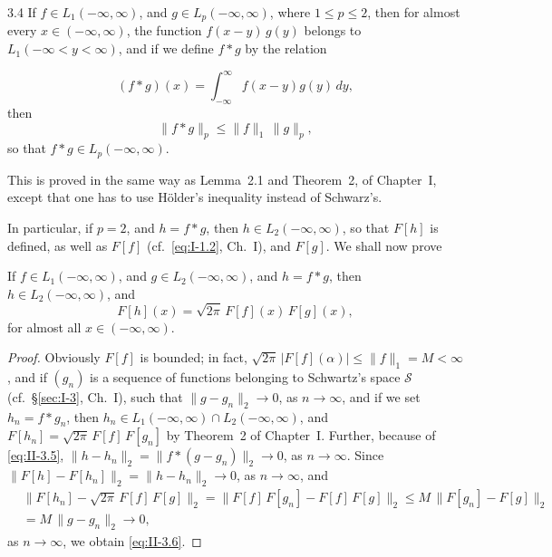 \begin{nstmt}{3.4}\label{eq:II-3.4}
If $f\in L_{1}(-\infty,\infty)$, and $g\in L_{p}(-\infty,\infty)$, where $1\le p\le 2$, then for almost every $x\in(-\infty,\infty)$, the function $f(x-y)\,g(y)$ belongs to $L_{1}(-\infty<y<\infty)$, and if we define $f*g$ by the relation
\end{nstmt}
\[
(f*g)(x)=\int_{-\infty}^{\infty}f(x-y)g(y)\,dy,
\]
then
\begin{equation}\tag{3.5}\label{eq:II-3.5}
\|f*g\|_{p}\le \|f\|_{1}\,\|g\|_{p},
\end{equation}
so that $f*g\in L_{p}(-\infty,\infty)$.

This is proved in the same way as Lemma~2.1 and Theorem~2, of Chapter~I, except that one has to use H\"older's inequality instead of Schwarz's.

In particular, if $p=2$, and $h=f*g$, then $h\in L_{2}(-\infty,\infty)$, so that $F[h]$ is defined, as well as $F[f]$ (cf.\ \eqref{eq:I-1.2}, Ch.~I), and $F[g]$. We shall now prove

\begin{theorem}\label{thm:II-4}
If $f\in L_{1}(-\infty,\infty)$, and $g\in L_{2}(-\infty,\infty)$, and $h=f*g$, then $h\in L_{2}(-\infty,\infty)$, and
\begin{equation*}\tag{3.6}\label{eq:II-3.6}
F[h](x)=\sqrt{2\pi}\,F[f](x)\,F[g](x),
\end{equation*}
for almost all $x\in(-\infty,\infty)$.
\end{theorem}
\begin{proof}
Obviously $F[f]$ is bounded; in fact, $\sqrt{2\pi}\,|F[f](\alpha)|\le \|f\|_{1}=M<\infty$, and if $(g_{n})$ is a sequence of functions belonging to Schwartz's space $\mathcal S$ (cf.\ \S\ref{sec:I-3}, Ch.~I), such that $\|g-g_{n}\|_{2}\to 0$, as $n\to\infty$, and if we set $h_{n}=f*g_{n}$, then $h_{n}\in L_{1}(-\infty,\infty)\cap L_{2}(-\infty,\infty)$, and $F[h_{n}]=\sqrt{2\pi}\,F[f]\,F[g_{n}]$ by Theorem~2 of Chapter~I. Further, because of \eqref{eq:II-3.5}, $\|h-h_{n}\|_{2}=\|f*(g-g_{n})\|_{2}\to 0$, as $n\to\infty$. Since $\|F[h]-F[h_{n}]\|_{2}=\|h-h_{n}\|_{2}\to 0$, as $n\to\infty$, and
\[
\begin{aligned}
&\|F[h_{n}]-\sqrt{2\pi}\,F[f]\,F[g]\|_{2} = \|F[f]\,F[g_{n}]-F[f]\,F[g]\|_{2}
\le M\,\|F[g_{n}]-F[g]\|_{2}\\
&= M\,\|g-g_{n}\|_{2}\to 0,
\end{aligned}
\]
as $n\to\infty$, we obtain \eqref{eq:II-3.6}.
\end{proof}

